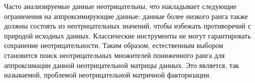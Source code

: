 Часто анализируемые данные неотрицательны, что накладывает следующие ограничения на аппроксимирующие данные:
данные более низкого ранга также должны состоять из неотрицательных значений, чтобы избежать противоречий с природой исходных данных.
Классические инструменты не могут гарантировать сохранение неотрицательности.
Таким образом, естественным выбором становится поиск неотрицательных множителей пониженного ранга для аппроксимации данной неотрицательной матрицы данных.
Это является, так называемой, проблемой неотрицательной матричной факторизации.
